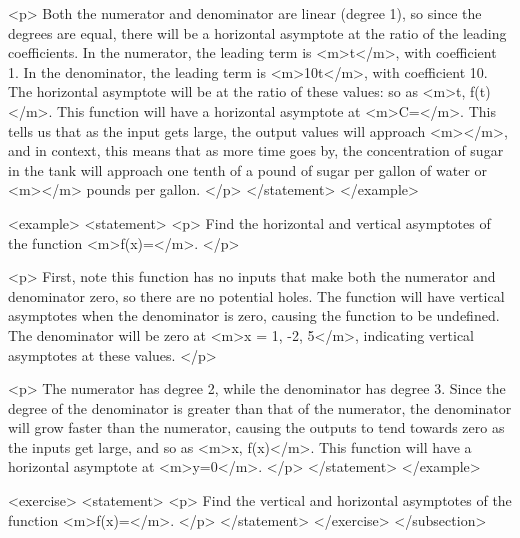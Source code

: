                 <p>
                    Both the numerator and denominator are linear (degree 1), so since the degrees are equal, there will be a horizontal asymptote at the ratio of the leading coefficients.
                    In the numerator, the leading term is <m>t</m>, with coefficient 1.
                    In the denominator, the leading term is <m>10t</m>, with coefficient 10.
                    The horizontal asymptote will be at the ratio of these values: so as <m>t\to \infty, f(t)\to {}</m>.
                    This function will have a horizontal asymptote at <m>C=</m>.
                    This tells us that as the input gets large, the output values will approach <m></m>, and in context, this means that as more time goes by, the concentration of sugar in the tank will approach one tenth of a pound of sugar per gallon of water or <m></m> pounds per gallon.
                </p>
            </statement>
        </example>

        <example>
            <statement>
                <p>
                    Find the horizontal and vertical asymptotes of the function <m>f(x)=</m>.
                </p>

                <p>
                    First, note this function has no inputs that make both the numerator and denominator zero, so there are no potential holes.
                    The function will have vertical asymptotes when the denominator is zero, causing the function to be undefined.
                    The denominator will be zero at <m>x = 1, -2, 5</m>, indicating vertical asymptotes at these values.
                </p>

                <p>
                    The numerator has degree 2, while the denominator has degree 3.
                    Since the degree of the denominator is greater than that of the numerator, the denominator will grow faster than the numerator, causing the outputs to tend towards zero as the inputs get large, and so as <m>x\to \pm \infty, f(x)</m>.
                    This function will have a horizontal asymptote at <m>y=0</m>.
                </p>
            </statement>
        </example>

        <exercise>
            <statement>
                <p>
                    Find the vertical and horizontal asymptotes of the function <m>f(x)=</m>.
                </p>
            </statement>
        </exercise>
    </subsection>


